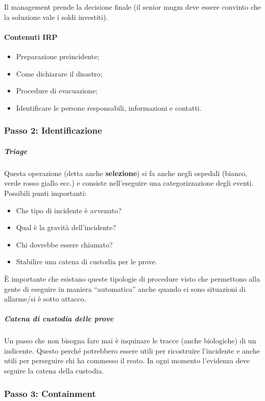Il management prende la decisione finale (il senior mngm deve essere convinto
che la soluzione vale i soldi investiti).

\paragraph*{Contenuti IRP}

\begin{itemize}
\item Preparazione preincidente;
\item Come dichiarare il disastro;
\item Procedure di evacuazione;
\item Identificare le persone responsabili, informazioni e contatti.
\end{itemize}

\subsubsection{Passo 2: Identificazione}

\subparagraph*{Triage} Questa operazione (detta anche \textbf{selezione}) si fa
anche negli ospedali (bianco, verde rosso giallo ecc.) e consiste nell'eseguire
una categorizzazione degli eventi. Possibili punti importanti:
\begin{itemize}
\item Che tipo di incidente è avvenuto?
\item Qual è la gravità dell'incidente?
\item Chi dovrebbe essere chiamato?
\item Stabilire una catena di custodia per le prove.
\end{itemize}

È importante che esistano queste tipologie di procedure visto che permettono alla
gente di eseguire in maniera ``automatica'' anche quando ci sono situazioni di
allarme/si è sotto attacco.

\subparagraph*{Catena di custodia delle prove} Un passo che non bisogna fare mai
è inquinare le tracce (anche biologiche) di un indicente. Questo perché
potrebbero essere utili per ricostruire l'incidente e anche utili per perseguire
chi ha commesso il reato.
In ogni momento l'evidenza deve seguire la catena della custodia.

\subsubsection{Passo 3: Containment}

